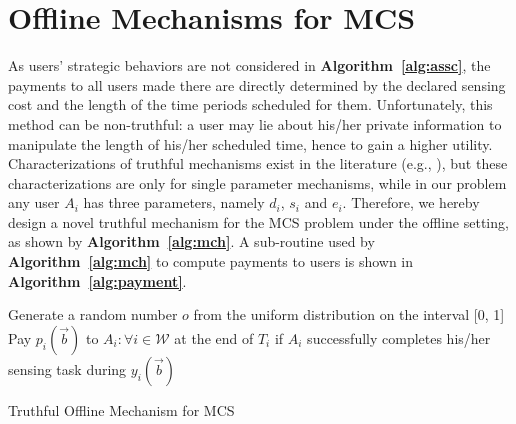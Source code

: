 \documentclass[10pt,journal,compsoc]{IEEEtran}
\begin{document}
\section{Offline Mechanisms for MCS} \label{sec:offline}
As users' strategic behaviors are not considered in \textbf{Algorithm~\ref{alg:assc}}, the payments to all users made there are directly determined by the declared sensing cost and the length of the time periods scheduled for them. Unfortunately, this method can be non-truthful: a user may lie about his/her private information to manipulate the length of his/her scheduled time, hence to gain a higher utility. Characterizations of truthful mechanisms exist in the literature (e.g., \cite{Myerson1981,Archer2001}), but these characterizations are only for single parameter mechanisms, while in our problem any user $A_i$ has three parameters, namely $d_i$, $s_i$ and $e_i$. Therefore, we hereby design a novel truthful mechanism for the MCS problem under the offline setting, as shown by \textbf{Algorithm~\ref{alg:mch}}. A sub-routine used by \textbf{Algorithm~\ref{alg:mch}} to compute payments to users is shown in \textbf{Algorithm~\ref{alg:payment}}.
\begin{algorithm}[h!]
Generate a random number $o$ from the uniform distribution on the interval [0, 1]~\\
    Pay $p_i(\vec{b})$ to $A_i\!: \forall i \in \mathcal{W}$ at the end of $T_i$ if $A_i$ successfully completes his/her sensing task during $y_i(\vec{b})$ \label{ln:postpaid}\\
\caption{Truthful Offline Mechanism for MCS}
    \label{alg:mch}
  \end{algorithm}
\end{document}
